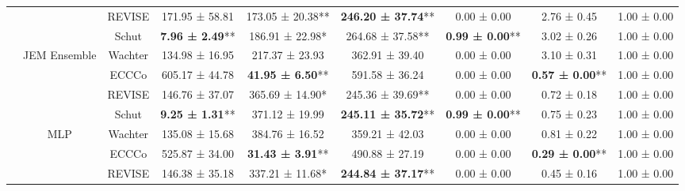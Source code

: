 \begin{table}
{\begin{tabular}[t]{ccccccccc}
 &  & REVISE & 171.95 ± 58.81\hphantom{*}\hphantom{*} & 173.05 ± 20.38** & \textbf{246.20 ± 37.74}** & 0.00 ± 0.00\hphantom{*}\hphantom{*} & 2.76 ± 0.45\hphantom{*}\hphantom{*} & 1.00 ± 0.00\hphantom{*}\hphantom{*}\\

 &  & Schut & \textbf{7.96 ± 2.49}** & 186.91 ± 22.98*\hphantom{*} & 264.68 ± 37.58** & \textbf{0.99 ± 0.00}** & 3.02 ± 0.26\hphantom{*}\hphantom{*} & 1.00 ± 0.00\hphantom{*}\hphantom{*}\\

 & \multirow[t]{-4}{*}{\centering\arraybackslash JEM Ensemble} & Wachter & 134.98 ± 16.95\hphantom{*}\hphantom{*} & 217.37 ± 23.93\hphantom{*}\hphantom{*} & 362.91 ± 39.40\hphantom{*}\hphantom{*} & 0.00 ± 0.00\hphantom{*}\hphantom{*} & 3.10 ± 0.31\hphantom{*}\hphantom{*} & 1.00 ± 0.00\hphantom{*}\hphantom{*}\\
\cmidrule{2-9}
 &  & ECCCo & 605.17 ± 44.78\hphantom{*}\hphantom{*} & \textbf{41.95 ± 6.50}** & 591.58 ± 36.24\hphantom{*}\hphantom{*} & 0.00 ± 0.00\hphantom{*}\hphantom{*} & \textbf{0.57 ± 0.00}** & 1.00 ± 0.00\hphantom{*}\hphantom{*}\\

 &  & REVISE & 146.76 ± 37.07\hphantom{*}\hphantom{*} & 365.69 ± 14.90*\hphantom{*} & 245.36 ± 39.69** & 0.00 ± 0.00\hphantom{*}\hphantom{*} & 0.72 ± 0.18\hphantom{*}\hphantom{*} & 1.00 ± 0.00\hphantom{*}\hphantom{*}\\

 &  & Schut & \textbf{9.25 ± 1.31}** & 371.12 ± 19.99\hphantom{*}\hphantom{*} & \textbf{245.11 ± 35.72}** & \textbf{0.99 ± 0.00}** & 0.75 ± 0.23\hphantom{*}\hphantom{*} & 1.00 ± 0.00\hphantom{*}\hphantom{*}\\

 & \multirow[t]{-4}{*}{\centering\arraybackslash MLP} & Wachter & 135.08 ± 15.68\hphantom{*}\hphantom{*} & 384.76 ± 16.52\hphantom{*}\hphantom{*} & 359.21 ± 42.03\hphantom{*}\hphantom{*} & 0.00 ± 0.00\hphantom{*}\hphantom{*} & 0.81 ± 0.22\hphantom{*}\hphantom{*} & 1.00 ± 0.00\hphantom{*}\hphantom{*}\\
\cmidrule{2-9}
 &  & ECCCo & 525.87 ± 34.00\hphantom{*}\hphantom{*} & \textbf{31.43 ± 3.91}** & 490.88 ± 27.19\hphantom{*}\hphantom{*} & 0.00 ± 0.00\hphantom{*}\hphantom{*} & \textbf{0.29 ± 0.00}** & 1.00 ± 0.00\hphantom{*}\hphantom{*}\\

 &  & REVISE & 146.38 ± 35.18\hphantom{*}\hphantom{*} & 337.21 ± 11.68*\hphantom{*} & \textbf{244.84 ± 37.17}** & 0.00 ± 0.00\hphantom{*}\hphantom{*} & 0.45 ± 0.16\hphantom{*}\hphantom{*} & 1.00 ± 0.00\hphantom{*}\hphantom{*}\\


\end{tabular}}
\end{table}

